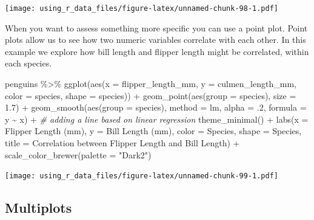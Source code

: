 \documentclass[
]{book}
\newenvironment{Shaded}{\begin{snugshade}}{\end{snugshade}}
\newcommand{\AttributeTok}[1]{\textcolor[rgb]{0.77,0.63,0.00}{#1}}
\newcommand{\CommentTok}[1]{\textcolor[rgb]{0.56,0.35,0.01}{\textit{#1}}}
\newcommand{\DecValTok}[1]{\textcolor[rgb]{0.00,0.00,0.81}{#1}}
\newcommand{\FloatTok}[1]{\textcolor[rgb]{0.00,0.00,0.81}{#1}}
\newcommand{\FunctionTok}[1]{\textcolor[rgb]{0.00,0.00,0.00}{#1}}
\newcommand{\NormalTok}[1]{#1}
\newcommand{\SpecialCharTok}[1]{\textcolor[rgb]{0.00,0.00,0.00}{#1}}
\newcommand{\StringTok}[1]{\textcolor[rgb]{0.31,0.60,0.02}{#1}}
\begin{document}
\texttt{[image: using\_r\_data\_files/figure-latex/unnamed-chunk-98-1.pdf]}

When you want to assess something more specific you can use a point plot.
Point plots allow us to see how two numeric variables correlate with each other.
In this example we explore how bill length and flipper length might be correlated, within each species.

\begin{Shaded}
\begin{Highlighting}[]
\NormalTok{penguins }\SpecialCharTok{\%\textgreater{}\%} 
  \FunctionTok{ggplot}\NormalTok{(}\FunctionTok{aes}\NormalTok{(}\AttributeTok{x =}\NormalTok{ flipper\_length\_mm, }\AttributeTok{y =}\NormalTok{ culmen\_length\_mm, }\AttributeTok{color =}\NormalTok{ species, }\AttributeTok{shape =}\NormalTok{ species)) }\SpecialCharTok{+} 
  \FunctionTok{geom\_point}\NormalTok{(}\FunctionTok{aes}\NormalTok{(}\AttributeTok{group =}\NormalTok{ species), }\AttributeTok{size =} \FloatTok{1.7}\NormalTok{) }\SpecialCharTok{+}
  \FunctionTok{geom\_smooth}\NormalTok{(}\FunctionTok{aes}\NormalTok{(}\AttributeTok{group =}\NormalTok{ species), }\AttributeTok{method =} \StringTok{\textquotesingle{}lm\textquotesingle{}}\NormalTok{, }\AttributeTok{alpha =}\NormalTok{ .}\DecValTok{2}\NormalTok{, }\AttributeTok{formula =} \StringTok{\textquotesingle{}y \textasciitilde{} x\textquotesingle{}}\NormalTok{) }\SpecialCharTok{+} \CommentTok{\# adding a line based on linear regression}
  \FunctionTok{theme\_minimal}\NormalTok{() }\SpecialCharTok{+}
  \FunctionTok{labs}\NormalTok{(}\AttributeTok{x =} \StringTok{\textquotesingle{}Flipper Length (mm)\textquotesingle{}}\NormalTok{, }\AttributeTok{y =} \StringTok{\textquotesingle{}Bill Length (mm)\textquotesingle{}}\NormalTok{,}
       \AttributeTok{color =} \StringTok{\textquotesingle{}Species\textquotesingle{}}\NormalTok{, }\AttributeTok{shape =} \StringTok{\textquotesingle{}Species\textquotesingle{}}\NormalTok{,}
       \AttributeTok{title =} \StringTok{\textquotesingle{}Correlation between Flipper Length and Bill Length\textquotesingle{}}\NormalTok{) }\SpecialCharTok{+}
  \FunctionTok{scale\_color\_brewer}\NormalTok{(}\AttributeTok{palette =} \StringTok{"Dark2"}\NormalTok{)}
\end{Highlighting}
\end{Shaded}

\texttt{[image: using\_r\_data\_files/figure-latex/unnamed-chunk-99-1.pdf]}

\hypertarget{multiplots}{%
\subsection{Multiplots}\label{multiplots}}
\end{document}

